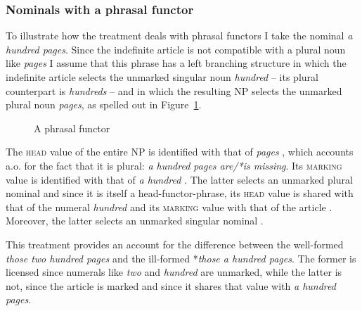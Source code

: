 \documentclass[output=paper
	        ,collection
	        ,collectionchapter
 	        ,biblatex
                ,babelshorthands
                ,newtxmath
                ,draftmode
                ,colorlinks, citecolor=brown
]{langscibook}
\begin{document}
        
\subsubsection{Nominals with a phrasal functor} 
\label{sec-phrasal-spec}


To illustrate how the treatment deals with phrasal functors I
take the nominal \emph{a hundred pages}. Since the indefinite article is not 
compatible with a plural noun like \emph{pages} I assume that this phrase  
has a left branching structure in which the indefinite article selects 
the unmarked singular noun \emph{hundred} -- its plural counterpart is \emph{hundreds} --  
and in which the resulting NP selects the unmarked plural noun 
\emph{pages}, as spelled out in Figure~\ref{glorie}. 
 
\begin{figure}
\centering
{}
\caption{\label{glorie} A phrasal functor}
\end{figure}

The \textsc{head} value of the entire NP is identified with that 
of \emph{pages} , which accounts a.o. for the fact that it is plural:
\emph{a hundred pages are/*is missing}. 
Its \textsc{marking} value is identified with that of \emph{a hundred} 
. The latter selects an unmarked plural nominal  and 
since it is itself a head-functor-phrase, its \textsc{head} value is shared with 
that of the numeral \emph{hundred}  and its \textsc{marking} value 
with that of the article . Moreover, the latter selects an unmarked 
singular nominal .
 
This treatment provides an account for the difference between 
the well-formed \emph{those two hundred pages} and the 
ill-formed *\emph{those a hundred pages}. The former is licensed since numerals 
like \emph{two} and \emph{hundred} are unmarked, while the latter is not, since 
the article is marked and since it shares that value with \emph{a hundred pages}.  
\end{document}
